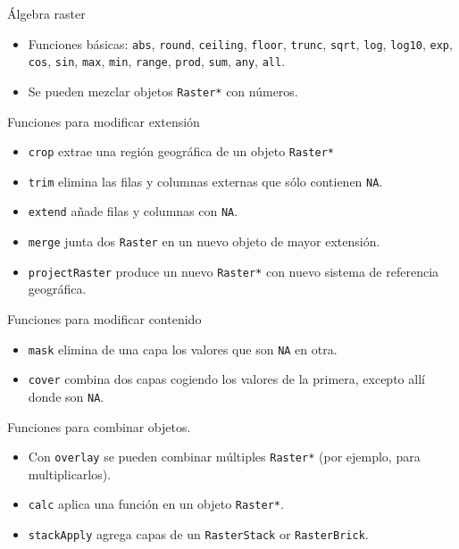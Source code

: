\documentclass[xcolor={usenames,svgnames,dvipsnames}]{beamer}
\begin{document}
\begin{frame}[fragile,label=sec-1-2-2]{Álgebra raster}
 \begin{itemize}
\item Funciones básicas: \texttt{abs}, \texttt{round}, \texttt{ceiling}, \texttt{floor}, \texttt{trunc},
\texttt{sqrt}, \texttt{log}, \texttt{log10}, \texttt{exp}, \texttt{cos}, \texttt{sin}, \texttt{max}, \texttt{min}, \texttt{range},
\texttt{prod}, \texttt{sum}, \texttt{any}, \texttt{all}.
\item Se pueden mezclar objetos \texttt{Raster*} con números.
\end{itemize}
\end{frame}

\begin{frame}[fragile,label=sec-1-2-3]{Funciones para modificar extensión}
 \begin{itemize}
\item \texttt{crop} extrae una región geográfica de un objeto \texttt{Raster*}
\item \texttt{trim} elimina las filas y columnas externas que sólo contienen \texttt{NA}.
\item \texttt{extend} añade filas y columnas con \texttt{NA}.
\item \texttt{merge} junta dos \texttt{Raster} en un nuevo objeto de mayor extensión.
\item \texttt{projectRaster} produce un nuevo \texttt{Raster*} con nuevo sistema de referencia geográfica.
\end{itemize}
\end{frame}
\begin{frame}[fragile,label=sec-1-2-4]{Funciones para modificar contenido}
 \begin{itemize}
\item \texttt{mask} elimina de una capa los valores que son \texttt{NA} en otra.
\item \texttt{cover} combina dos capas cogiendo los valores de la primera, excepto allí donde son \texttt{NA}.
\end{itemize}
\end{frame}
\begin{frame}[fragile,label=sec-1-2-5]{Funciones para combinar objetos.}
 \begin{itemize}
\item Con \texttt{overlay} se pueden combinar múltiples \texttt{Raster*} (por ejemplo, para multiplicarlos).
\item \texttt{calc} aplica una función en un objeto \texttt{Raster*}.
\item \texttt{stackApply} agrega capas de un \texttt{RasterStack} or \texttt{RasterBrick}.
\end{itemize}
\end{frame}
\end{document}
